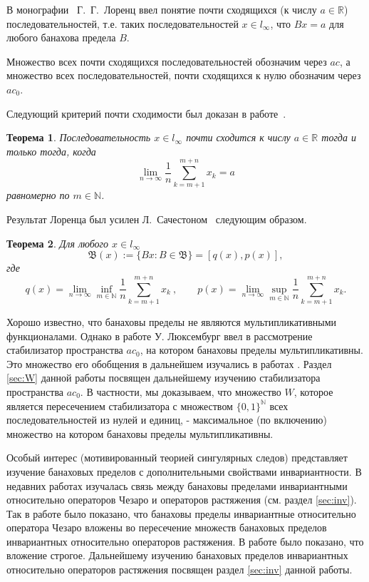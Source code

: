 \documentclass[12pt]{article}
\newtheorem{thm}{Теорема}
\def\N{{\mathbb{N}}}
\begin{document}
В монографии~\cite{L} Г.~Г.~Лоренц ввел понятие почти сходящихся (к числу $a\in \mathbb R$) последовательностей, т.е. таких последовательностей $x\in l_\infty$, что $Bx=a$ для любого банахова предела $B$.

Множество всех почти сходящихся последовательностей обозначим через $ac$,
а множество всех последовательностей, почти сходящихся к нулю обозначим через $ac_0$.

Следующий критерий почти сходимости был доказан в работе~\cite{L}.
\begin{thm}\label{lorentz}
Последовательность $x\in l_\infty$ почти сходится к числу $a\in \mathbb R$ тогда и только тогда, когда
$$
 \lim_{n\to\infty}\frac1n\sum_{k=m+1}^{m+n}x_k=a
$$
равномерно по $m\in{\mathbb N}$.
\end{thm}

Результат Лоренца был усилен Л.~Сачестоном~\cite{S} следующим образом.
\begin{thm}\label{sucheston}
Для любого $x\in l_\infty$
$$\mathfrak B (x):=\{Bx: B\in \mathfrak B\}=[q(x),p(x)],$$
где
$$
 q(x)=\lim_{n\to\infty}\inf_{m\in\mathbb N}
  \frac1n \sum_{k=m+1}^{m+n} x_k \ ,
\qquad
 p(x)=\lim_{n\to\infty}\sup_{m\in\mathbb N}
  \frac1n \sum_{k=m+1}^{m+n} x_k.
$$
\end{thm}

Хорошо известно, что банаховы пределы не являются мультипликативными функционалами. Однако в работе \cite{Luxemburg} У. Люксембург ввел в рассмотрение стабилизатор пространства $ac_0$, на котором банаховы пределы мультипликативны. Это множество его обобщения в дальнейшем изучались в работах \cite{Alekhno, SSU2, ASSU4}. Раздел \ref{sec:W} данной работы посвящен дальнейшему изучению стабилизатора пространства $ac_0$. В частности, мы доказываем, что множество $W$, которое является пересечением стабилизатора с множеством $\{0,1\}^\N$ всех последовательностей из нулей и единиц, - максимальное (по включению) множество на котором банаховы пределы мультипликативны.

Особый интерес (мотивированный теорией сингулярных следов) представляет изучение банаховых пределов с дополнительными свойствами инвариантности. В недавних работах изучалась связь между банаховы пределами инвариантными относительно операторов Чезаро и операторов растяжения (см. раздел \ref{sec:inv}). Так в работе \cite{SSUZ2} было показано, что банаховы пределы инвариантные относительно оператора Чезаро вложены во пересечение множеств  банаховых пределов инвариантных относительно операторов растяжения. В работе \cite{SSUZ3} было показано, что вложение строгое. Дальнейшему изучению банаховых пределов инвариантных относительно операторов растяжения посвящен раздел \ref{sec:inv} данной работы.
\end{document}
